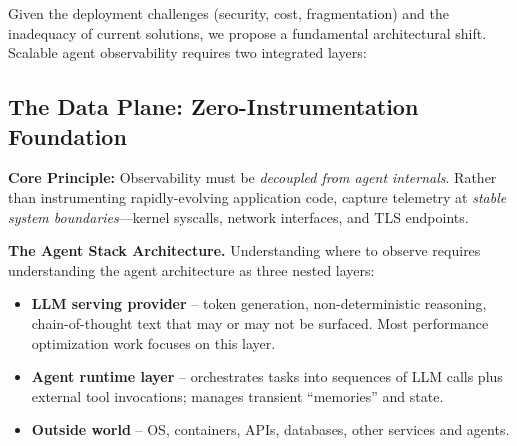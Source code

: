 \documentclass[sigplan,screen,review,9pt]{acmart}
\begin{document}
Given the deployment challenges (security, cost, fragmentation) and the inadequacy of current solutions, we propose a fundamental architectural shift. Scalable agent observability requires two integrated layers:

\subsection{The Data Plane: Zero-Instrumentation Foundation}

\textbf{Core Principle:} Observability must be \emph{decoupled from agent internals}. Rather than instrumenting rapidly-evolving application code, capture telemetry at \emph{stable system boundaries}—kernel syscalls, network interfaces, and TLS endpoints.

\textbf{The Agent Stack Architecture.} Understanding where to observe requires understanding the agent architecture as three nested layers:


\begin{comment}
    

\begin{center}
    
\begin{Verbatim}[fontsize=\small, commandchars=\\\{\}]
┌───────────────────────────────────────────────┐
│          ☁  Rest of workspace / system       │
│  (APIs, DBs, message bus, OS, Kubernetes…)    │
│                                               │
│   ┌───────────────────────────────────────┐   │
│   │       Agent runtime / framework       │   │
│   │ (LangChain, claude-code, gemini-cli …)│   │
│   │  • orchestrates prompts & tool calls  │   │
│   │  • owns scratch memory / vector DB    │   │
│   └───────────────────────────────────────┘   │
│               ↑ outbound API calls            │
│───────────────────────────────────────────────│
│               ↓ inbound events                │
│   ┌───────────────────────────────────────┐   │
│   │          LLM serving provider         │   │
│   │    (OpenAI endpoint, local llama.cpp) │   │
│   └───────────────────────────────────────┘   │
└───────────────────────────────────────────────┘
\end{Verbatim}
\end{center}
\end{comment}


\begin{itemize}
  \item \textbf{LLM serving provider} – token generation, non-deterministic reasoning, chain-of-thought text that may or may not be surfaced. Most performance optimization work focuses on this layer.
  \item \textbf{Agent runtime layer} – orchestrates tasks into sequences of LLM calls plus external tool invocations; manages transient ``memories'' and state.
  \item \textbf{Outside world} – OS, containers, APIs, databases, other services and agents.
\end{itemize}
\end{document}
